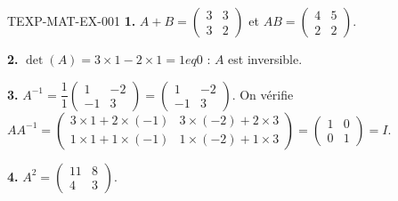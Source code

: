 \begin{corrige}{TEXP-MAT-EX-001}
\textbf{1.} $A+B=\begin{pmatrix}3&3\\3&2\end{pmatrix}$ et $AB=\begin{pmatrix}4&5\\2&2\end{pmatrix}$.

\textbf{2.} $\det(A)=3\times1-2\times1=1
eq0$ : $A$ est inversible.

\textbf{3.} $A^{-1}=\dfrac{1}{1}\begin{pmatrix}1&-2\\-1&3\end{pmatrix}=\begin{pmatrix}1&-2\\-1&3\end{pmatrix}$. On vérifie $AA^{-1}=\begin{pmatrix}3\times1+2\times(-1)&3\times(-2)+2\times3\\1\times1+1\times(-1)&1\times(-2)+1\times3\end{pmatrix}=\begin{pmatrix}1&0\\0&1\end{pmatrix}=I$.

\textbf{4.} $A^2=\begin{pmatrix}11&8\\4&3\end{pmatrix}$.
\end{corrige}
